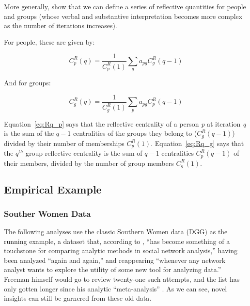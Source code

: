 \documentclass[a4paper,fleqn]{cas-sc}
\begin{document}
More generally, \citet{hidalgo2009building} show that we can define a series of reflective quantities for people and groups (whose verbal and substantive interpretation becomes more complex as the number of iterations increases). 

For people, these are given by:

\begin{equation}   
    C^R_p(q) = \frac{1}{C^R_p(1)}\sum_g a_{pg}C^R_g(q-1) 
   \label{eq:Rq_p}
\end{equation}

And for groups:

\begin{equation}
   C^R_g(q) = \frac{1}{C^R_g(1)}\sum_p a_{pg}C^R_p(q-1)
   \label{eq:Rq_g}
\end{equation}

Equation~\ref{eq:Rq_p} says that the reflective centrality of a person \textit{p} at iteration \textit{q} is the sum of the $q-1$ centralities of the groups they belong to ($C^R_g(q-1)$) divided by their number of memberships $C^{R}_p(1)$. Equation~\ref{eq:Rq_g} says that the $q^{th}$ group reflective centrality is the sum of $q-1$ centralities $C^R_p(q-1)$ of their members, divided by the number of group members $C^R_g(1)$.



\subsection{Empirical Example} \label{subsec:ex}
\subsubsection{Souther Women Data}
The following analyses use the classic Southern Women data \citep{davis1941} (DGG) as the running example, a dataset that, according to \citet[p.]{freeman2003finding}, ``has become something of a touchstone for comparing analytic methods in social network analysis,'' having been analyzed ``again and again,'' and reappearing ``whenever any network analyst wants to explore the utility of some new tool for analyzing data.'' Freeman himself would go to review twenty-one such attempts, and the list has only gotten longer since his analytic ``meta-analysis'' \citep[e.g.,][]{doreian2004generalized, field2006identifying, roffilli2006identifying, wang2009exponential, everett2018measuring, lerner2022dynamic, batagelj2022analysis,  lizardo2024two}. As we can see, novel insights can still be garnered from these old data.
\end{document}
